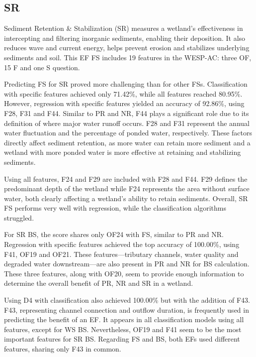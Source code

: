 \documentclass[12pt,letterpaper]{article}
\begin{document}
\subsection{SR}
Sediment Retention \& Stabilization (\ac{SR}) measures a wetland's effectiveness in intercepting and filtering inorganic sediments, enabling their deposition.
It also reduces wave and current energy, helps prevent erosion and stabilizes underlying sediments and soil.
This \ac{EF} \ac{FS} includes 19 features in the \ac{WESP-AC}: three OF, 15 F and one S question.

Predicting \ac{FS} for \ac{SR} proved more challenging than for other \ac{FS}s.
Classification with specific features achieved only 71.42\%, while all features reached 80.95\%.
However, regression with specific features yielded an accuracy of 92.86\%, using F28, F31 and F44.
Similar to \ac{PR} and \ac{NR}, F44 plays a significant role due to its definition of where major water runoff occurs.
F28 and F31 represent the annual water fluctuation and the percentage of ponded water, respectively.
These factors directly affect sediment retention, as more water can retain more sediment and a wetland with more ponded water is more effective at retaining and stabilizing sediments.

Using all features, F24 and F29 are included with F28 and F44.
F29 defines the predominant depth of the wetland while F24 represents the area without surface water, both clearly affecting a wetland's ability to retain sediments.
Overall, \ac{SR} \ac{FS} performs very well with regression, while the classification algorithms struggled.

For \ac{SR} \ac{BS}, the score shares only OF24 with \ac{FS}, similar to \ac{PR} and \ac{NR}.
Regression with specific features achieved the top accuracy of 100.00\%, using F41, OF19 and OF21.
These features—tributary channels, water quality and degraded water downstream—are also present in \ac{PR} and \ac{NR} for \ac{BS} calculation.
These three features, along with OF20, seem to provide enough information to determine the overall benefit of \ac{PR}, \ac{NR} and \ac{SR} in a wetland.

Using D4 with classification also achieved 100.00\% but with the addition of F43.
F43, representing channel connection and outflow duration, is frequently used in predicting the benefit of an \ac{EF}.
It appears in all classification models using all features, except for \ac{WS} \ac{BS}.
Nevertheless, OF19 and F41 seem to be the most important features for \ac{SR} \ac{BS}.
Regarding \ac{FS} and \ac{BS}, both \ac{EF}s used different features, sharing only F43 in common.
\end{document}
